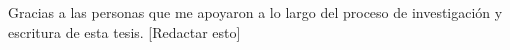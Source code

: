 \begin{acknowledgements}

  Gracias a las personas que me apoyaron a lo largo del proceso de investigación y escritura de esta tesis. 
  [Redactar esto]
\end{acknowledgements}